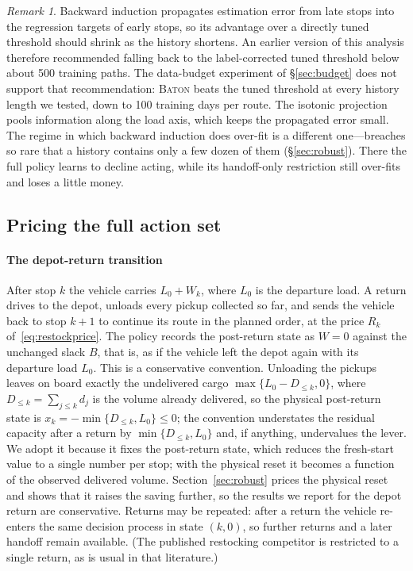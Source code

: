 \documentclass[preprint,authoryear,12pt]{elsarticle}
\theoremstyle{definition}
\theoremstyle{remark}
\newtheorem{remark}{Remark}
\begin{document}
\begin{remark}\label{rem:smalln}
Backward induction propagates estimation error from late stops into the
regression targets of early stops, so its advantage over a directly
tuned threshold should shrink as the history shortens. An earlier
version of this analysis therefore recommended falling back to the
label-corrected tuned threshold below about 500 training paths. The
data-budget experiment of \S\ref{sec:budget} does not support that
recommendation: \textsc{Baton} beats the tuned threshold at every
history length we tested, down to 100 training days per route. The
isotonic projection pools information along the load axis, which keeps
the propagated error small. The regime in which backward induction
does over-fit is a different one---breaches so rare that a history
contains only a few dozen of them (\S\ref{sec:robust}). There the
full policy learns to decline acting, while its handoff-only restriction
still over-fits and loses a little money.
\end{remark}

\subsection{Pricing the full action set}\label{sec:actions}

\paragraph{The depot-return transition} After stop $k$ the vehicle
carries $L_0 + W_k$, where $L_0$ is the departure load. A return drives
to the depot, unloads every pickup collected so far, and sends the
vehicle back to stop $k+1$ to continue its route in the planned order,
at the price $R_k$ of~\eqref{eq:restockprice}. The policy records the
post-return state as $W = 0$ against the unchanged slack $B$, that is,
as if the vehicle left the depot again with its departure load $L_0$.
This is a conservative convention. Unloading the pickups leaves on
board exactly the undelivered cargo $\max\{L_0 - D_{\le k}, 0\}$, where
$D_{\le k} = \sum_{j \le k} d_j$ is the volume already delivered, so the
physical post-return state is $x_k = -\min\{D_{\le k}, L_0\} \le 0$;
the convention understates the residual capacity after a return by
$\min\{D_{\le k}, L_0\}$ and, if anything, undervalues the lever. We adopt it because it fixes the
post-return state, which reduces the fresh-start value to a single
number per stop; with the physical reset it becomes a function of the
observed delivered volume. Section~\ref{sec:robust} prices the physical
reset and shows that it raises the saving further, so the results we
report for the depot return are conservative. Returns may be repeated:
after a return the vehicle re-enters the same decision process in state
$(k, 0)$, so further returns and a later handoff remain available. (The
published restocking competitor is restricted to a single return, as is
usual in that literature.)
\end{document}
